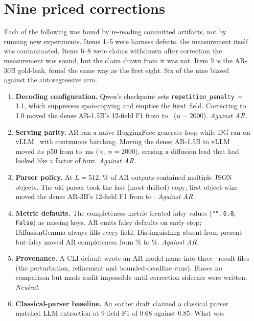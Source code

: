 \section{Nine priced corrections}
\label{app:defects} Each of the following was found by re-reading committed artifacts, not by
running new experiments. Items 1--5 were harness defects, the measurement
itself was contaminated. Items 6--8 were claims withdrawn after correction
the measurement was sound, but the claim drawn from it was not. Item 9 is
the AR-30B gold-leak, found the same way as the first eight. Six of
the nine biased against the autoregressive arm. \begin{enumerate}
\item \textbf{Decoding configuration.} Qwen's checkpoint sets
\texttt{repetition\_penalty}\,$=$\,1.1, which suppresses span-copying and
empties the \texttt{host} field. Correcting to 1.0 moved the dense AR-1.5B's
12-field F1 from  to \ ($n{=}2000$).
\emph{Against AR.} \item \textbf{Serving parity.} AR ran a naive HuggingFace generate
loop while DG ran on vLLM~\cite{vllm2023} with continuous
batching. Moving the dense AR-1.5B to vLLM moved its p50 from
 to \,ms ($\times$,
$n{=}2000$), erasing a diffusion lead that had looked like a factor of four.
\emph{Against AR.} \item \textbf{Parser policy.} At $L{=}512$, \rambleRate\% of AR outputs
contained multiple JSON objects. The old parser took the last (most-drifted)
copy; first-object-wins moved the dense AR-3B's 12-field F1 from
 to . \emph{Against AR.} \item \textbf{Metric defaults.} The completeness metric treated falsy values
(\texttt{""}, \texttt{0.0}, \texttt{False}) as missing keys. AR
emits falsy defaults on early stop; DiffusionGemma always fills every field.
Distinguishing absent from present-but-falsy moved AR completeness from
\% to \%. \emph{Against AR.} \item \textbf{Provenance.} A CLI default wrote an AR model name into three
\LLaDA\ result files (the perturbation, refinement and bounded-deadline runs).
Biases no comparison but made audit impossible until correction
sidecars were written. \emph{Neutral.} \item \textbf{Classical-parser baseline.} An earlier draft claimed a classical
parser matched LLM extraction at 9-field F1 of $0.68$ against $0.85$. What was

\end{enumerate}
